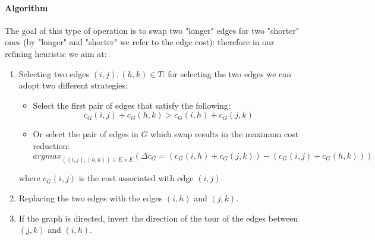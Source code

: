 \documentclass{article}
\begin{document}
\paragraph{Algorithm}
The goal of this type of operation is to swap two "longer" edges for two "shorter" ones (by "longer" and "shorter" we refer to the edge cost): 
therefore in our refining heuristic we aim at:
\begin{enumerate}
	\item Selecting two edges $(i, j), (h, k) \in T$: for selecting the two edges we can adopt two different strategies:
	\begin{itemize}
		\item Select the first pair of edges that satisfy the following:
		\begin{equation}
			c_{G}(i, j) + c_{G}(h, k) > c_{G}(i, h) + c_{G}(j, k)
			\label{eq:2-opt-move}
		\end{equation}
		\item Or select the pair of edges in $G$ which swap results in the maximum cost reduction:
		\begin{equation}
			\textit{argmax}_{((i, j), (h, k)) \in E \times E} (\Delta c_G = (c_G(i, h) + c_G(j, k)) - (c_G(i, j) + c_G(h, k)))
			\label{eq:2-opt-move-argmax}
		\end{equation}
	\end{itemize}
	
	where $c_G(i, j)$ is the cost associated with edge $(i, j)$.
	\item Replacing the two edges with the edges $(i, h)$ and $(j, k)$.
	\item If the graph is directed, invert the direction of the tour of the edges between $(j, k)$ and $(i, h)$.
\end{enumerate}
\end{document}

